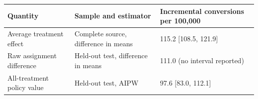 \begin{tabular}{@{}lll@{}}
\toprule
Quantity & Sample and estimator & Incremental conversions per 100,000 \\
\midrule
Average treatment effect & Complete source, difference in means & 115.2 [108.5, 121.9] \\
Raw assignment difference & Held-out test, difference in means & 111.0 (no interval reported) \\
All-treatment policy value & Held-out test, AIPW & 97.6 [83.0, 112.1] \\
\bottomrule
\end{tabular}
